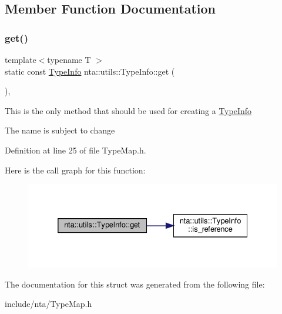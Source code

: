 \subsection{Member Function Documentation}
\mbox{\label{structnta_1_1utils_1_1TypeInfo_ae478709ae382b3f85cfa2e9d529681a7}} 
\subsubsection{\texorpdfstring{get()}{get()}}
{\footnotesize\ttfamily template$<$typename T $>$ \\
static const \hyperlink{structnta_1_1utils_1_1TypeInfo}{Type\+Info} nta\+::utils\+::\+Type\+Info\+::get (\begin{DoxyParamCaption}{ }\end{DoxyParamCaption})\hspace{0.3cm}{\ttfamily [inline]}, {\ttfamily [static]}}

This is the only method that should be used for creating a \hyperlink{structnta_1_1utils_1_1TypeInfo}{Type\+Info}

The name is subject to change 

Definition at line 25 of file Type\+Map.\+h.

Here is the call graph for this function\+:
\nopagebreak
\begin{figure}[H]
\begin{center}
\leavevmode
\includegraphics[width=332pt]{d0/d50/structnta_1_1utils_1_1TypeInfo_ae478709ae382b3f85cfa2e9d529681a7_cgraph}
\end{center}
\end{figure}


The documentation for this struct was generated from the following file\+:\begin{DoxyCompactItemize}
\item 
include/nta/Type\+Map.\+h\end{DoxyCompactItemize}
